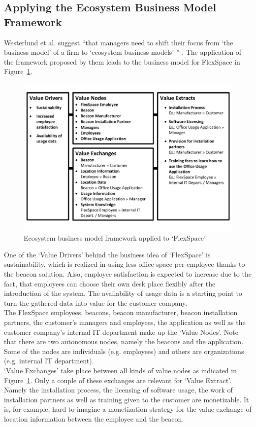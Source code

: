 	\subsection{Applying the Ecosystem Business Model Framework}
	\vspace{-1em}
		Westerlund et al. suggest ``that managers need to shift their focus from `the business model' of a firm to `ecosystem business models' '' \cite{westerlund}. The application of the framework proposed by them leads to the business model for FlexSpace in Figure~\ref{fig:use_case_westerlund}.
		\begin{figure}[ht]
		    \begin{center}
		    \includegraphics[scale=0.55]{Talk11/use_case_westerlund.pdf}
		    \end{center}
		    \caption{Ecosystem business model framework applied to `FlexSpace'}
		    \label{fig:use_case_westerlund}
		\end{figure}
		One of the `Value Drivers' behind the business idea of `FlexSpace' is sustainability, which is realized in using less office space per employee thanks to the beacon solution. Also, employee satisfaction is expected to increase due to the fact, that employees can choose their own desk place flexibly after the introduction of the system. The availability of usage data is a starting point to turn the gathered data into value for the customer company.\\
		The FlexSpace employees, beacons, beacon manufacturer, beacon installation partners, the customer's managers and employees, the application as well as the customer company's internal IT department make up the `Value Nodes'. Note that there are two autonomous nodes, namely the beacons and the application. Some of the nodes are individuals (e.g. employees) and others are organizations (e.g. internal IT department).\\
		`Value Exchanges' take place between all kinds of value nodes as indicated in Figure~\ref{fig:use_case_westerlund}. Only a couple of these exchanges are relevant for `Value Extract'. Namely the installation process, the licensing of software usage, the work of installation partners as well as training given to the customer are monetizable. It is, for example, hard to imagine a monetization strategy for the value exchange of location information between the employee and the beacon.
	\vspace{-1em}
